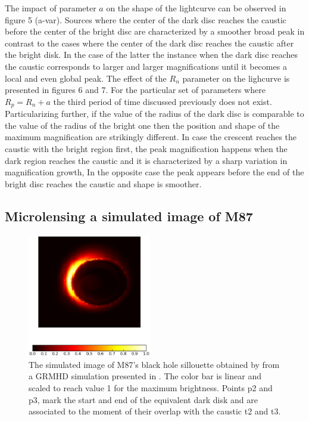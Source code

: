 The impact of parameter $a$ on the shape of the lightcurve can be observed in figure 5 (a-var). Sources where 
the center of the dark disc reaches the caustic before the center of the bright disc are characterized by a smoother
broad peak in contrast to the cases where the center of the dark disc reaches the caustic after the bright disk.
In the case of the latter the instance when the dark disc reaches the caustic corresponds to larger and
larger magnifications until it becomes a local and even global peak. The effect of the $R_n$  parameter on the
lighcurve is presented in figures 6 and 7. For the particular set of parameters where $R_p = R_n +a$ the third
period of time discussed previously does not exist. Particularizing further, if the value of the radius of the dark
disc is comparable to the value of the radius of the bright one then the position and shape of the maximum magnification
 are strikingly different. In case the crescent reaches the caustic with the bright region first, the peak magnification
 happens when the dark region reaches the caustic and it is characterized by a sharp variation in magnification growth,
In the opposite case the peak appears before the end of the bright disc reaches the caustic and shape is smoother. \\


\subsection{Microlensing a simulated image of M87}

\begin{figure}
\centering
        \includegraphics[width = 0.48\textwidth]{plots/M87_image.eps}
\caption{\label{fig:M87_image} The simulated image of M87's black hole sillouette obtained by \citep{2012MNRAS.421.1517D} from a GRMHD simulation presented in \citep{2009MNRAS.394L.126M}. The color bar is linear and scaled to reach value 1 for the maximum brightness. Points p2 and p3, mark the start and end of the equivalent dark disk and are associated to the moment of their overlap with the caustic t2 and t3.}
\end{figure}


